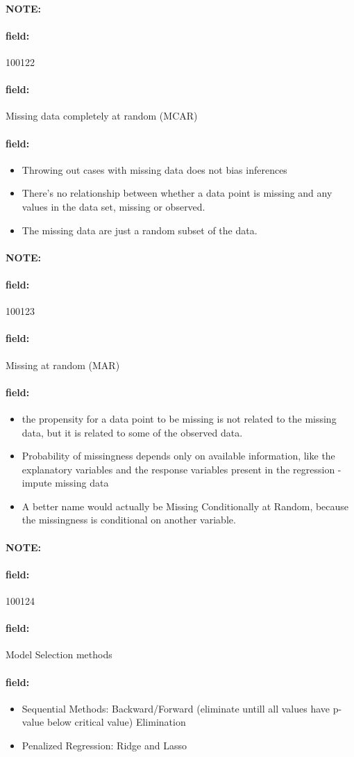 \documentclass[12pt]{article}
\newenvironment{note}{\paragraph{NOTE:}}{}
\newenvironment{field}{\paragraph{field:}}{}
\begin{document}
\begin{note} \begin{field} \tiny 100122 \end{field}
 \begin{field}
  Missing data completely at random (MCAR)
 \end{field}
 \begin{field}
  \begin{itemize}
   \item Throwing out cases with missing data does not bias inferences
   \item There’s no relationship between whether a data point is missing and any values in the data set, missing or observed.
   \item The missing data are just a random subset of the data.
  \end{itemize}
 \end{field}
\end{note}

\begin{note} \begin{field} \tiny 100123 \end{field}
 \begin{field}
  Missing at random (MAR)
 \end{field}
 \begin{field}
   \begin{itemize}
     \item the propensity for a data point to be missing is not related to the missing data, but it is related to some of the observed data.
     \item Probability of missingness depends only on available information, like the explanatory variables and the response variables present in the regression - impute missing data
     \item A better name would actually be Missing Conditionally at Random, because the missingness is conditional on another variable.
   \end{itemize}

 \end{field}
\end{note}

\begin{note} \begin{field} \tiny 100124 \end{field}
 \begin{field}
  Model Selection methods
 \end{field}
 \begin{field}
  \begin{itemize}
   \item Sequential Methods: Backward/Forward (eliminate untill all values have p-value below critical value) Elimination
   \item Penalized Regression: Ridge and Lasso
  \end{itemize}
 \end{field}
\end{note}
\end{document}
